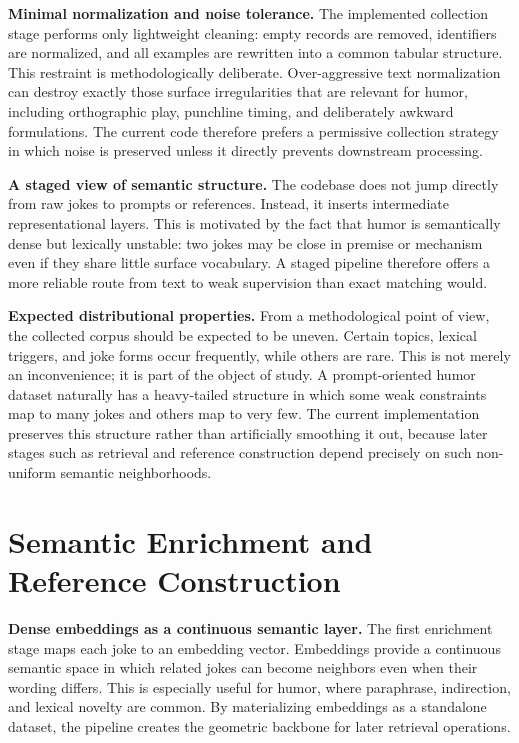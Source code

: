 \documentclass[11pt]{article}
\begin{document}
\textbf{Minimal normalization and noise tolerance.} The implemented collection stage performs only lightweight cleaning: empty records are removed, identifiers are normalized, and all examples are rewritten into a common tabular structure. This restraint is methodologically deliberate. Over-aggressive text normalization can destroy exactly those surface irregularities that are relevant for humor, including orthographic play, punchline timing, and deliberately awkward formulations. The current code therefore prefers a permissive collection strategy in which noise is preserved unless it directly prevents downstream processing.

\textbf{A staged view of semantic structure.} The codebase does not jump directly from raw jokes to prompts or references. Instead, it inserts intermediate representational layers. This is motivated by the fact that humor is semantically dense but lexically unstable: two jokes may be close in premise or mechanism even if they share little surface vocabulary. A staged pipeline therefore offers a more reliable route from text to weak supervision than exact matching would.

\textbf{Expected distributional properties.} From a methodological point of view, the collected corpus should be expected to be uneven. Certain topics, lexical triggers, and joke forms occur frequently, while others are rare. This is not merely an inconvenience; it is part of the object of study. A prompt-oriented humor dataset naturally has a heavy-tailed structure in which some weak constraints map to many jokes and others map to very few. The current implementation preserves this structure rather than artificially smoothing it out, because later stages such as retrieval and reference construction depend precisely on such non-uniform semantic neighborhoods.

\section{Semantic Enrichment and Reference Construction}

\textbf{Dense embeddings as a continuous semantic layer.} The first enrichment stage maps each joke to an embedding vector. Embeddings provide a continuous semantic space in which related jokes can become neighbors even when their wording differs. This is especially useful for humor, where paraphrase, indirection, and lexical novelty are common. By materializing embeddings as a standalone dataset, the pipeline creates the geometric backbone for later retrieval operations.
\end{document}
